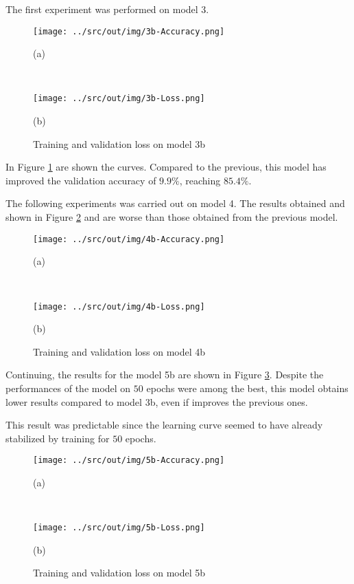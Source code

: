 \documentclass[a4paper,12pt]{article} %
\begin{document}
	The first experiment was performed on model 3.
		
	\begin{figure}[H]
		\begin{minipage}[c]{.49\textwidth}
			\centering
			\texttt{[image: ../src/out/img/3b-Accuracy.png]}
			\caption*{(a)}
		\end{minipage}
		~
		\begin{minipage}[c]{.49\textwidth}
			\centering
			\texttt{[image: ../src/out/img/3b-Loss.png]}
			\caption*{(b)}
		\end{minipage}
		\caption{Training and validation loss on model 3b}
		\label{fig:model3b-performance}
	\end{figure}

 	In Figure \ref{fig:model3b-performance} are shown the curves. Compared to 
 	the previous, this model has improved the validation accuracy of $9.9\%$, 
	reaching $85.4\%$.
	\newline
	
	The following experiments was carried out on model 4. The results obtained 
	and shown in Figure \ref{fig:model4b-performance} and are worse than those 
	obtained from the previous model.
	
	\begin{figure}[htb]
		\begin{minipage}[c]{.49\textwidth}
			\centering
			\texttt{[image: ../src/out/img/4b-Accuracy.png]}
			\caption*{(a)}
		\end{minipage}
		~
		\begin{minipage}[c]{.49\textwidth}
			\centering
			\texttt{[image: ../src/out/img/4b-Loss.png]}
			\caption*{(b)}
		\end{minipage}
		\caption{Training and validation loss on model 4b}
		\label{fig:model4b-performance}
	\end{figure}
	
	Continuing, the results for the model 5b are shown in Figure 
	\ref{fig:model5b-performance}. Despite the performances of the model on 
	$50$ epochs were among the best, this model obtains lower results compared 
	to model 3b, even if improves the previous ones.
	
	This result was predictable since the learning curve seemed to have already 
	stabilized by training for $50$ epochs.
	
	\begin{figure}[htb]
		\begin{minipage}[c]{.49\textwidth}
			\centering
			\texttt{[image: ../src/out/img/5b-Accuracy.png]}
			\caption*{(a)}
		\end{minipage}
		~
		\begin{minipage}[c]{.49\textwidth}
			\centering
			\texttt{[image: ../src/out/img/5b-Loss.png]}
			\caption*{(b)}
		\end{minipage}
		\caption{Training and validation loss on model 5b}
		\label{fig:model5b-performance}
	\end{figure}
	
\end{document}
